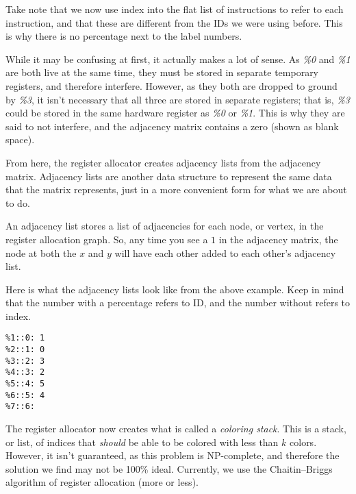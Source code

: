 \documentclass[
12pt,
letterpaper,
oneside,
]{memoir}
\begin{document}
\begin{center}
{\small Take note that we now use index into the flat list of instructions to refer to each instruction, and that these are different from the IDs we were using before. This is why there is no percentage next to the label numbers.}
\end{center}

While it may be confusing at first, it actually makes a lot of sense. As \emph{\%0} and \emph{\%1} are both live at the same time, they must be stored in separate temporary registers, and therefore interfere. However, as they both are dropped to ground by \emph{\%3}, it isn't necessary that all three are stored in separate registers; that is, \emph{\%3} could be stored in the same hardware register as \emph{\%0} or \emph{\%1}. This is why they are said to not interfere, and the adjacency matrix contains a zero (shown as blank space).

\filbreak

From here, the register allocator creates adjacency lists from the adjacency matrix. Adjacency lists are another data structure to represent the same data that the matrix represents, just in a more convenient form for what we are about to do.

An adjacency list stores a list of adjacencies for each node, or vertex, in the register allocation graph. So, any time you see a $1$ in the adjacency matrix, the node at both the $x$ and $y$ will have each other added to each other's adjacency list.

\filbreak

Here is what the adjacency lists look like from the above example. Keep in mind that the number with a percentage refers to ID, and the number without refers to index.

\begin{verbatim}
%1::0: 1
%2::1: 0
%3::2: 3
%4::3: 2
%5::4: 5
%6::5: 4
%7::6:
\end{verbatim}

\filbreak

The register allocator now creates what is called a \emph{coloring stack}. This is a stack, or list, of indices that \emph{should} be able to be colored with less than $k$ colors. However, it isn't guaranteed, as this problem is NP-complete, and therefore the solution we find may not be 100\% ideal. Currently, we use the Chaitin--Briggs algorithm of register allocation (more or less).
\end{document}
